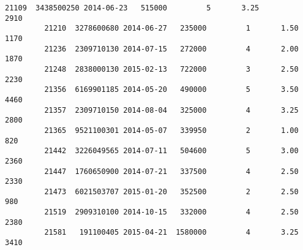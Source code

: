 \documentclass[11pt]{article}
\begin{document}
\begin{Verbatim}[commandchars=\\\{\}]
         21109  3438500250 2014-06-23   515000         5       3.25         2910   
         21210  3278600680 2014-06-27   235000         1       1.50         1170   
         21236  2309710130 2014-07-15   272000         4       2.00         1870   
         21248  2838000130 2015-02-13   722000         3       2.50         2230   
         21356  6169901185 2014-05-20   490000         5       3.50         4460   
         21357  2309710150 2014-08-04   325000         4       3.25         2800   
         21365  9521100301 2014-05-07   339950         2       1.00          820   
         21442  3226049565 2014-07-11   504600         5       3.00         2360   
         21447  1760650900 2014-07-21   337500         4       2.50         2330   
         21473  6021503707 2015-01-20   352500         2       2.50          980   
         21519  2909310100 2014-10-15   332000         4       2.50         2380   
         21581   191100405 2015-04-21  1580000         4       3.25         3410   
         

\end{Verbatim}
\end{document}
